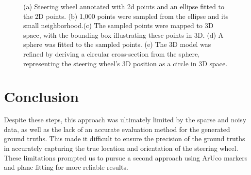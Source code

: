 \begin{figure}[ht]
\begin{subfigure}[t]{0.18\textwidth}
        \caption{}
        \label{fig:circle}
    \end{subfigure}\hfill
    \caption{(a) Steering wheel annotated with 2d points 
    and an ellipse fitted to the 2D points. (b) 1,000 points were sampled from the ellipse 
    and its small neighborhood.(c) The sampled points were mapped to 3D space, 
    with the bounding box illustrating these points in 3D. 
    (d) A sphere was fitted to the sampled points. 
    (e) The 3D model was refined by deriving a 
    circular cross-section from the sphere, representing 
    the steering wheel’s 3D position as a circle in 
    3D space.}
\end{figure}


\section{Conclusion}
Despite these steps, this approach was ultimately limited by the sparse 
and noisy data, as well as the lack of an accurate evaluation method 
for the generated ground truths. This made it difficult to ensure the 
precision of the ground truths in accurately capturing the true location and orientation of the 
steering wheel. These limitations prompted us to pursue a second 
approach using ArUco markers and plane fitting for more reliable 
results.


